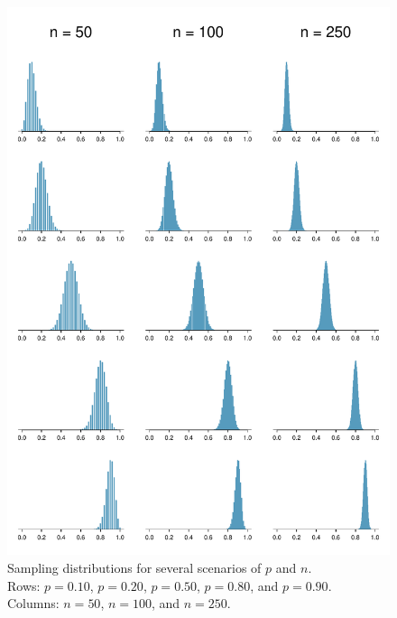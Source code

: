 \begin{figure}
   \centering
   \includegraphics[width=\textwidth]{ch_distributions/figures/clt_prop_grid/clt_prop_grid_2}
   \caption{Sampling distributions for several scenarios
       of $p$ and $n$. \\
       Rows: $p = 0.10$, $p = 0.20$, $p = 0.50$,
       $p = 0.80$, and $p = 0.90$. \\
       Columns: $n = 50$, $n = 100$, and $n = 250$.}
   \label{clt_prop_grid_2}
\end{figure}

